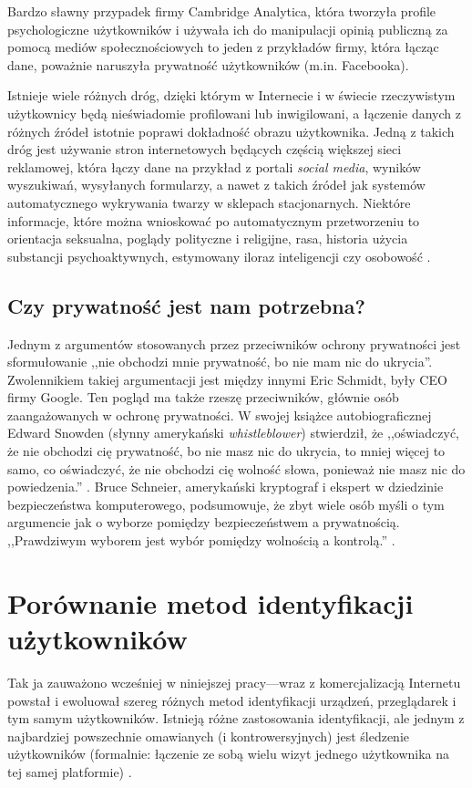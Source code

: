 Bardzo sławny przypadek firmy Cambridge Analytica, która tworzyła profile
psychologiczne użytkowników i używała ich do manipulacji opinią publiczną za
pomocą mediów społecznościowych to jeden z przykładów firmy, która łącząc dane,
poważnie naruszyła prywatność użytkowników (m.in. Facebooka).

Istnieje wiele różnych dróg, dzięki którym w Internecie i w świecie rzeczywistym
użytkownicy będą nieświadomie profilowani lub inwigilowani, a łączenie danych z
różnych źródeł istotnie poprawi dokładność obrazu użytkownika. Jedną z takich
dróg jest używanie stron internetowych będących częścią większej sieci
reklamowej, która łączy dane na przykład z portali \emph{social media}, wyników
wyszukiwań, wysyłanych formularzy, a nawet z takich źródeł jak systemów
automatycznego wykrywania twarzy w sklepach stacjonarnych. Niektóre informacje,
które można wnioskować po automatycznym przetworzeniu to orientacja seksualna,
poglądy polityczne i religijne, rasa, historia użycia substancji
psychoaktywnych, estymowany iloraz inteligencji czy osobowość
\cite{kosinski2013private}.

\subsection{Czy prywatność jest nam potrzebna?} %
Jednym z argumentów stosowanych przez przeciwników ochrony prywatności jest
sformułowanie ,,nie obchodzi mnie prywatność, bo nie mam nic do ukrycia''.
Zwolennikiem takiej argumentacji jest między innymi Eric Schmidt, były CEO firmy
Google. Ten pogląd ma także rzeszę przeciwników, głównie osób zaangażowanych w
ochronę prywatności. W swojej książce autobiograficznej Edward Snowden (słynny
amerykański \emph{whistleblower}) stwierdził, że ,,oświadczyć, że nie obchodzi
cię prywatność, bo nie masz nic do ukrycia, to mniej więcej to samo, co
oświadczyć, że nie obchodzi cię wolność słowa, ponieważ nie masz nic do
powiedzenia.'' \cite{snowden2019pamiec}. Bruce Schneier, amerykański kryptograf
i ekspert w dziedzinie bezpieczeństwa komputerowego, podsumowuje, że zbyt wiele
osób myśli o tym argumencie jak o wyborze pomiędzy bezpieczeństwem a
prywatnością. ,,Prawdziwym wyborem jest wybór pomiędzy wolnością a kontrolą.''
\cite{schneier2006eternal}.

\section{Porównanie metod identyfikacji użytkowników}
Tak ja zauważono wcześniej w niniejszej pracy---wraz z komercjalizacją Internetu
powstał i ewoluował szereg różnych metod identyfikacji urządzeń, przeglądarek i
tym samym użytkowników. Istnieją różne zastosowania identyfikacji, ale jednym z
najbardziej powszechnie omawianych (i kontrowersyjnych) jest śledzenie
użytkowników (formalnie: łączenie ze sobą wielu wizyt jednego użytkownika na tej
samej platformie) \cite[s. 3]{al2020too}.

